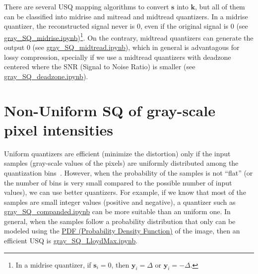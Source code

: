 There are several USQ mapping algorithms to convert $\mathbf{s}$ into
$\mathbf{k}$, but all of them can be classified into midrise and
mitread and midtread quantizers. In a midrise quantizer, the
reconstructed signal never is 0, even if the original signal is 0 (see
\href{https://github.com/Sistemas-Multimedia/Sistemas-Multimedia.github.io/blob/master/contents/gray_SQ/gray_SQ_midrise.ipynb}{gray\_SQ\_midrise.ipynb})\footnote{In
a midrise quantizer, if $\mathbf{s}_i=0$, then $\mathbf{y}_i=\Delta$
or $\mathbf{y}_i=-\Delta$.}. On the contrary, midtread quantizers can
generate the output 0 (see
\href{https://github.com/Sistemas-Multimedia/Sistemas-Multimedia.github.io/blob/master/contents/gray_SQ/gray_SQ_midtread.ipynb}{gray\_SQ\_midtread.ipynb}),
which in general is advantagous for lossy compression, specially if we
use a midtread quantizers with deadzone centered where the SNR (Signal
to Noise Ratio) is smaller (see
\href{https://github.com/Sistemas-Multimedia/Sistemas-Multimedia.github.io/blob/master/contents/gray_SQ/gray_SQ_deadzone.ipynb}{gray\_SQ\_deadzone.ipynb}). 

\section{Non-Uniform SQ of gray-scale pixel intensities}
Uniform quantizers are efficient (minimize the distortion) only if the
input samples (gray-scale values of the pixels) are uniformly
distributed among the quantization
bins~\cite{vruiz__scalar_quantization}. However, when the probability
of the samples is not ``flat'' (or the number of bins is very small
compared to the possible number of input values), we can use better
quantizers. For example, if we know that most of the samples are small
integer values (positive and negative), a quantizer such as
\href{https://github.com/Sistemas-Multimedia/Sistemas-Multimedia.github.io/blob/master/contents/gray_SQ/gray_SQ_companded.ipynb}{gray\_SQ\_companded.ipynb}
can be more suitable than an uniform one. In general, when the samples
follow a probability distribution that only can be modeled using the
\href{https://en.wikipedia.org/wiki/Probability_density_function}{PDF
  (Probability Density Function)} of the image, then an efficient USQ
is
\href{https://github.com/Sistemas-Multimedia/Sistemas-Multimedia.github.io/blob/master/contents/gray_SQ/gray_SQ_LloydMax.ipynb}{gray\_SQ\_LloydMax.ipynb}.

